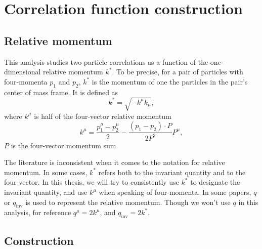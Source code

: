 \section{Correlation function construction}
\label{sec:CorrelationFunctionConstruction}
\subsection{Relative momentum}
\label{sec:RelativeMomentum}

This analysis studies two-particle correlations as a function of the one-dimensional relative momentum $k^*$.
To be precise, for a pair of particles with four-momenta $p_1$ and $p_2$, $k^*$ is the momentum of one the particles in the pair's center of mass frame.
It is defined as
\begin{equation}
\label{eq:kstar}
k^*= \sqrt{-k^\mu k_\mu},
\end{equation}
where $k^\mu$ is half of the four-vector relative momentum
\begin{equation}
\label{eq:kmu}
k^\mu = \frac{p_1^\mu - p_2^\mu}{2} -\frac{(p_1 - p_2)\cdot P}{2P^2}P^\mu,
\end{equation}
$P$ is the four-vector momentum sum.

The literature is inconsistent when it comes to the notation for relative momentum.
In some cases, $k^*$ refers both to the invariant quantity and to the four-vector.
In this thesis, we will try to consistently use $k^*$ to designate the invariant quantity, and use $k^\mu$ when speaking of four-momenta.
In some papers, $q$ or $q_{\mathrm{inv}}$ is used to represent the relative momentum.
Though we won't use $q$ in this analysis, for reference
$q^\mu = 2k^\mu$, and $q_{\mathrm{inv}} = 2 k^*$.


\subsection{Construction}
\label{sec:CFconstruct}

